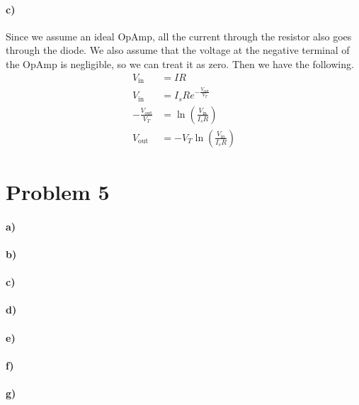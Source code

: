 \documentclass[12pt]{article}
\begin{document}
\paragraph{c)}

Since we assume an ideal OpAmp, all the current through the resistor also goes
through the diode. We also assume that the voltage at the negative terminal of the OpAmp
is negligible, so we can treat it as zero. Then we have the following.
\begin{align*}
    V_\text{in}&=IR\\
    V_\text{in}&=I_sRe^{-\frac{V_\text{out}}{V_T}}\\
    -\frac{V_\text{out}}{V_T}&=\ln\left(\frac{V_\text{in}}{I_sR}\right)\\
    V_\text{out}&=-V_T\ln\left(\frac{V_\text{in}}{I_sR}\right)
\end{align*}

\section*{Problem 5}

\paragraph{a)}

\paragraph{b)}

\paragraph{c)}

\paragraph{d)}

\paragraph{e)}

\paragraph{f)}

\paragraph{g)}
\end{document}
